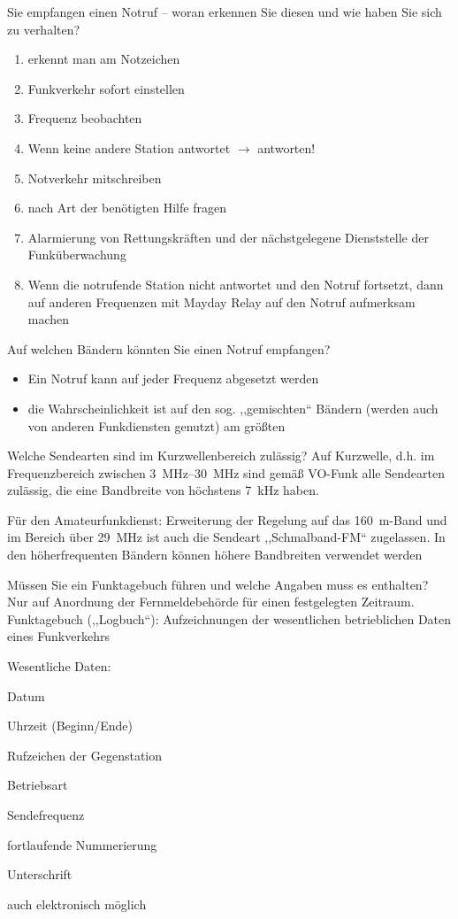 \documentclass[avery5371,grid,frame,a4paper]{flashcards}
\newcommand{\card}[3]{
  \begin{flashcard}[{\chap} -- #1]{#2}#3\end{flashcard}
}
\begin{document}
\card{34}{Sie empfangen einen Notruf – woran erkennen Sie diesen und wie haben Sie sich zu verhalten?}{
  \footnotesize
  \begin{enumerate}\itemsep0pt
    \item erkennt man am Notzeichen
    \item Funkverkehr sofort einstellen
    \item Frequenz beobachten
    \item Wenn keine andere Station antwortet $\rightarrow$ antworten!
    \item Notverkehr mitschreiben
    \item nach Art der benötigten Hilfe fragen
    \item Alarmierung von Rettungskräften und der nächstgelegene Dienststelle der Funküberwachung
    \item Wenn die notrufende Station nicht antwortet und den Notruf fortsetzt, dann auf anderen Frequenzen mit Mayday Relay auf den Notruf aufmerksam machen
  \end{enumerate}
}
\card{35}{Auf welchen Bändern könnten Sie einen Notruf empfangen?}{
  \begin{itemize}
    \item Ein Notruf kann auf jeder Frequenz abgesetzt werden
    \item die Wahrscheinlichkeit ist auf den sog. ,,gemischten`` Bändern (werden auch von anderen Funkdiensten genutzt) am größten
  \end{itemize}
}
\card{36}{Welche Sendearten sind im Kurzwellenbereich zulässig?}{
  Auf Kurzwelle, d.h. im Frequenzbereich zwischen \SIrange{3}{30}{\mega\Hz} sind gemäß VO-Funk alle Sendearten zulässig, die eine Bandbreite von höchstens \SI{7}{\kilo\Hz} haben.

  Für den Amateurfunkdienst: Erweiterung der Regelung auf das \SI{160}{\metre}-Band und im Bereich über \SI{29}{\mega\Hz} ist auch die Sendeart ,,Schmalband-FM`` zugelassen. In den höherfrequenten Bändern können höhere Bandbreiten verwendet werden
}
\card{37}{Müssen Sie ein Funktagebuch führen und welche Angaben muss es enthalten?}{
  Nur auf Anordnung der Fernmeldebehörde für einen festgelegten Zeitraum.
  Funktagebuch (,,Logbuch``): Aufzeichnungen der wesentlichen betrieblichen Daten eines Funkverkehrs

  Wesentliche Daten:
  \begin{itemize*}
    \item Datum
    \item Uhrzeit (Beginn/Ende)
    \item Rufzeichen der Gegenstation
    \item Betriebsart
    \item Sendefrequenz
    \item fortlaufende Nummerierung
    \item Unterschrift
    \item auch elektronisch möglich
  \end{itemize*}
}
\end{document}
